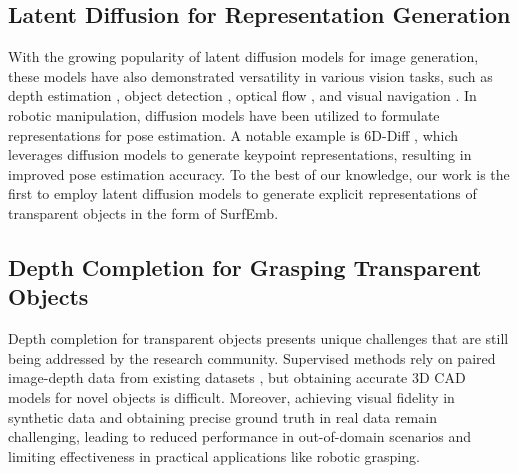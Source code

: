 \subsection{Latent Diffusion for Representation Generation}

With the growing popularity of latent diffusion models for image generation, these models have also demonstrated versatility in various vision tasks, such as depth estimation \cite{Ke2024marigold}, object detection \cite{chen2023diffusiondet}, optical flow \cite{saxena2024surprising}, and visual navigation \cite{sridhar2024nomad}. In robotic manipulation, diffusion models have been utilized to formulate representations for pose estimation. A notable example is 6D-Diff \cite{xu20246ddiff}, which leverages diffusion models to generate keypoint representations, resulting in improved pose estimation accuracy. To the best of our knowledge, our work is the first to employ latent diffusion models to generate explicit representations of transparent objects in the form of SurfEmb.

\subsection{Depth Completion for Grasping Transparent Objects}


Depth completion for transparent objects presents unique challenges that are still being addressed by the research community. Supervised methods rely on paired image-depth data from existing datasets \cite{ichnowski-2022-corl, chen-2022-eccv, kim2024transpose}, but obtaining accurate 3D CAD models for novel objects is difficult. Moreover, achieving visual fidelity in synthetic data and obtaining precise ground truth in real data remain challenging, leading to reduced performance in out-of-domain scenarios and limiting effectiveness in practical applications like robotic grasping.

